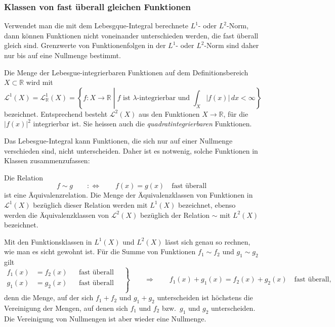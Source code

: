 %
%
\subsubsection{Klassen von fast überall gleichen Funktionen}
Verwendet man die mit dem Lebesgque-Integral berechnete $L^1$- oder
$L^2$-Norm, dann können Funktionen nicht voneinander unterschieden werden,
die fast überall gleich sind.
Grenzwerte von Funktionenfolgen in der $L^1$- oder $L^2$-Norm sind
daher nur bis auf eine Nullmenge bestimmt.

\begin{definition}
Die Menge der Lebesgue-integrierbaren Funktionen auf dem Definitionsbereich
$X\subset\mathbb{R}$ wird mit
\[
\mathscr{L}^1(X)
=
\mathscr{L}^1_{\mathbb{R}}(X)
=
\left\{ f\colon X\to \mathbb{R}
\;\left|\;
\text{$f$ ist $\lambda$-integrierbar und $\int_X|f(x)|\,dx< \infty$}
\right.\right\}
\]
bezeichnet.
Entsprechend besteht $\mathscr{L}^2(X)$ aus den Funktionen $X\to \mathbb{R}$,
für die $|f(x)|^2$ integrierbar ist.
Sie heissen auch die {\em quadratintegrierbaren} Funktionen.
\end{definition}

Das Lebesgue-Integral kann Funktionen, die sich nur auf einer Nullmenge
verschieden sind, nicht unterscheiden. 
Daher ist es notwenig, solche Funktionen in Klassen zusammenzufassen:

\begin{definition}
Die Relation
\[
f\sim g
\qquad:\Leftrightarrow \qquad f(x) = g(x)\quad\text{fast überall}
\]
ist eine Äquivalenzrelation.
Die Menge der Äquivalenzklassen von Funktionen in $\mathscr{L}^1(X)$
bezüglich dieser Relation werden mit $L^1(X)$ bezeichnet, ebenso werden
die Äquivalenzklassen von $\mathscr{L}^2(X)$ bezüglich der Relation $\sim$
mit $L^2(X)$ bezeichnet.
\end{definition}

Mit den Funktionsklassen in $L^1(X)$ und $L^2(X)$ lässt sich genau
so rechnen, wie man es sicht gewohnt ist.
Für die Summe von Funktionen $f_1\sim f_2$ und $g_1\sim g_2$ gilt
\[
\left.
\begin{aligned}
f_1(x)&=f_2(x)&&\text{fast überall}\\
g_1(x)&=g_2(x)&&\text{fast überall}\\
\end{aligned}
\quad
\right\}
\qquad
\Rightarrow
\qquad
f_1(x)+g_1(x) = f_2(x)+g_2(x)\quad\text{fast überall},
\]
denn die Menge, auf der sich $f_1+f_2$ und $g_1+g_2$ unterscheiden
ist höchstens die Vereinigung der Mengen, auf denen sich $f_1$ und 
$f_2$ bzw.~$g_1$ und $g_2$ unterscheiden.
Die Vereinigung von Nullmengen ist aber wieder eine Nullmenge.

